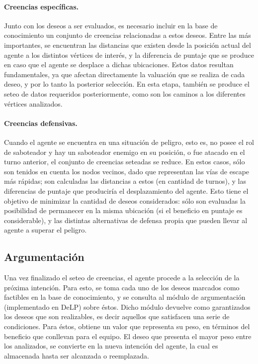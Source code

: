 \documentclass[oneside]{book}
\theoremstyle{definition}
\theoremstyle{example}
\begin{document}
\paragraph{Creencias específicas.} %

Junto con los deseos a ser evaluados, es necesario incluir en la base de conocimiento 
un conjunto de creencias relacionadas a estos deseos. Entre las más importantes, se 
encuentran las distancias que existen desde la posición actual del agente a los distintos 
vértices de interés, y la diferencia de puntaje que se produce en caso que el agente se desplace 
a dichas ubicaciones. Estos datos resultan fundamentales, ya que afectan directamente la 
valuación que se realiza de cada deseo, y por lo tanto la posterior selección. 
En esta etapa, también se produce el seteo de datos requeridos posteriormente, como son 
los caminos a los diferentes vértices analizados. 

\paragraph{Creencias defensivas.} %

Cuando el agente se encuentra en una situación de peligro, esto es, no posee el rol de 
saboteador y hay un saboteador enemigo en su posición, o fue atacado en el turno anterior, 
el conjunto de creencias seteadas se reduce. En estos casos, sólo son tenidos en cuenta 
los nodos vecinos, dado que representan las vías de escape más rápidas; son calculadas 
las distancias a estos (en cantidad de turnos), y las diferencias de puntaje que produciría 
el desplazamiento del agente. Esto tiene el objetivo de minimizar la cantidad de deseos 
considerados: sólo son evaluadas la posibilidad de permanecer en la misma ubicación 
(si el beneficio en puntaje es considerable), y las distintas alternativas de defensa 
propia que pueden llevar al agente a superar el peligro.

\subsection{Argumentación}

\label{sec:argumentacion}

Una vez finalizado el seteo de creencias, el agente procede a la selección de la próxima 
intención. Para esto, se toma cada uno de los deseos marcados como factibles en la base 
de conocimiento, y se consulta al módulo de argumentación (implementado en DeLP) sobre éstos. 
Dicho módulo
devuelve como garantizados los deseos que son realizables, es decir aquellos que satisfacen
una serie de condiciones.
Para éstos, obtiene un valor que representa su peso, en términos del 
beneficio que conllevan para el equipo. El deseo que presenta el mayor peso entre los 
analizados, se convierte en la nueva intención del agente, la cual es almacenada hasta ser 
alcanzada o reemplazada.
\end{document}

